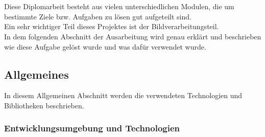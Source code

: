 \chapter{\docname}
\label{\docname}


\begin{flushleft}
	Diese Diplomarbeit besteht aus vielen unterschiedlichen Modulen, die um
	bestimmte Ziele bzw. Aufgaben zu lösen gut aufgeteilt sind.\\
	Ein sehr wichtiger Teil dieses Projektes ist der Bildverarbeitungsteil.\\
	In dem folgenden Abschnitt der Ausarbeitung wird  genau erklärt und beschrieben
	wie diese Aufgabe gelöst wurde und was dafür verwendet wurde.\\ 
\end{flushleft}

\section{Allgemeines}

In diesem Allgemeinen Abschnitt werden die verwendeten Technologien und
Bibliotheken beschrieben.

\subsection{Entwicklungsumgebung und Technologien}

